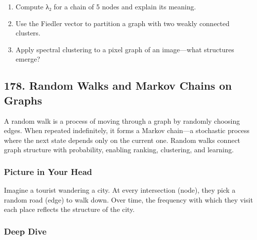 \documentclass[
  letterpaper,
  DIV=11,
  numbers=noendperiod]{scrreprt}
\providecommand{\tightlist}{%
  \setlength{\itemsep}{0pt}\setlength{\parskip}{0pt}}
\begin{document}
\begin{enumerate}
\def\labelenumi{\arabic{enumi}.}
\tightlist
\item
  Compute λ₂ for a chain of 5 nodes and explain its meaning.
\item
  Use the Fiedler vector to partition a graph with two weakly connected
  clusters.
\item
  Apply spectral clustering to a pixel graph of an image---what
  structures emerge?
\end{enumerate}

\subsection{178. Random Walks and Markov Chains on
Graphs}\label{random-walks-and-markov-chains-on-graphs}

A random walk is a process of moving through a graph by randomly
choosing edges. When repeated indefinitely, it forms a Markov chain---a
stochastic process where the next state depends only on the current one.
Random walks connect graph structure with probability, enabling ranking,
clustering, and learning.

\subsubsection{Picture in Your Head}\label{picture-in-your-head-177}

Imagine a tourist wandering a city. At every intersection (node), they
pick a random road (edge) to walk down. Over time, the frequency with
which they visit each place reflects the structure of the city.

\subsubsection{Deep Dive}\label{deep-dive-177}
\end{document}

